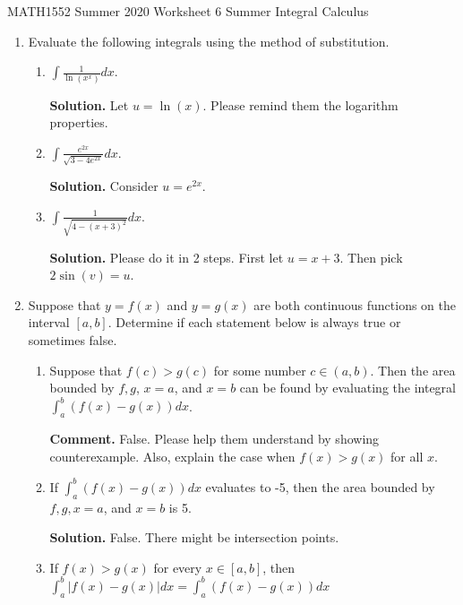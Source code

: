 \documentclass[12pt]{article}
\begin{document}
\noindent
MATH1552 Summer 2020
\hspace{2.2cm}
Worksheet 6 Summer
\hspace{2cm} Integral Calculus

\vspace{2mm}


\begin{enumerate}

\item Evaluate the following integrals using the method of substitution.



\begin{enumerate}
\item $\int \frac{1}{\ln(x^x)}dx$.

\textbf{Solution. } Let $u=\ln(x)$. Please remind them the logarithm properties. 

\item $\int \frac{e^{2x}}{\sqrt{3-4e^{2x}}}dx$.

\textbf{Solution. } Consider $u=e^{2x}$.

\item $\int \frac{1}{\sqrt{4-(x+3)^2}}dx$.

\textbf{Solution. } Please do it in 2 steps. First let $u=x+3$. Then pick $2\sin(v)=u$. 
\end{enumerate}

\item Suppose that $y = f(x)$ and $y = g(x)$ are both continuous functions on the interval $[a ,b]$.
Determine if each statement below is always true or sometimes false.

\begin{enumerate}
\item Suppose that $f(c) > g(c)$ for some number $c\in (a, b)$. Then the area bounded by $f, g$,
$x = a$, and $x = b$ can be found by evaluating the integral $\int_a^b (f(x)-g(x))dx$.

\textbf{Comment. } False. Please help them understand by showing counterexample. Also, explain the case when $f(x)>g(x)$ for all $x$.

\item If $\int_a^b (f(x)-g(x))dx$  evaluates to -5, then the area bounded by $f, g, x = a$, and $x = b$
is 5.

\textbf{Solution. } False. There might be intersection points.

\item  If $f(x) > g(x)$ for every $x \in [a, b]$, then $\int_a^b |f(x)-g(x)|dx =\int_a^b (f(x)-g(x))dx$


\end{enumerate}
\end{enumerate}
\end{document}
